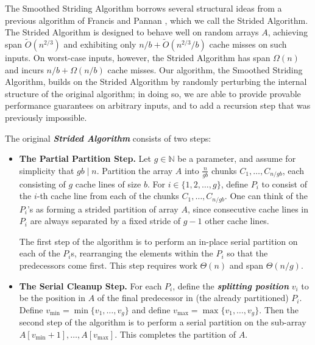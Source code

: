 \documentclass[11pt]{article}
\newcommand{\defn}[1]{{\textit{\textbf{\boldmath #1}}}}
\renewcommand{\paragraph}[1]{\vspace{0.09in}\noindent{\bf \boldmath #1.}}
\theoremstyle{remark}
\theoremstyle{remark}
\begin{document}
\paragraph{The Strided Algorithm \cite{FrancisPa92}}
The Smoothed Striding Algorithm borrows several structural ideas from a
previous algorithm of Francis and Pannan \cite{FrancisPa92}, which we call the
Strided Algorithm. The Strided Algorithm is designed to behave well on random
arrays $A$, achieving span $\tilde{O}(n^{2/3})$ and exhibiting only $n/b +
\tilde{O}(n^{2/3} / b)$  cache misses on such inputs. On worst-case inputs,
however, the Strided Algorithm has span $\Omega(n)$ and incurs $n/b +
\Omega(n/b)$ cache misses. Our algorithm, the Smoothed Striding Algorithm, builds
on the Strided Algorithm by randomly perturbing the internal structure of
the original algorithm; in doing so, we are able to provide provable performance guarantees
on arbitrary inputs, and to add a recursion step that was previously
impossible.

The original \defn{Strided Algorithm} consists of two steps: 
\begin{itemize}
\item \textbf{The Partial Partition Step.} Let $g \in \mathbb{N}$ be a
  parameter, and assume for simplicity that $gb \mid n$. Partition the
  array $A$ into $\frac{n}{gb}$ chunks $C_1, \ldots, C_{n / gb}$,
  each consisting of $g$ cache lines of size $b$.
	For $i \in \{1, 2, \ldots, g\}$, define 
  $P_i$ to consist of the $i$-th cache line from each of the
  chunks $C_1, \ldots, C_{n / gb}$. One can think of the $P_i$'s
	as forming a strided partition of array $A$, since
  consecutive cache lines in $P_i$ are always separated by a fixed
  stride of $g - 1$ other cache lines.

  The first step of the algorithm is to perform an in-place serial
  partition on each of the $P_i$s, rearranging the elements within the
  $P_i$ so that the predecessors come first. This step requires work
  $\Theta(n)$ and span $\Theta(n/g)$.
\item \textbf{The Serial Cleanup Step. }For each $P_i$, define the \defn{splitting position} $v_i$ to be
  the position in $A$ of the final predecessor in (the already
  partitioned) $P_i$. Define $v_{\text{min}} = \min\{v_1, \ldots,
  v_{g}\}$ and define $v_{\text{max}} = \max\{v_1, \ldots, v_{g}\}$. Then the
  second step of the algorithm is to perform a serial partition on the
	sub-array $A[v_{\text{min}}+1],\ldots, A[v_{\text{max}}]$. This completes the   
   partition of $A$.
\end{itemize}
\end{document}
